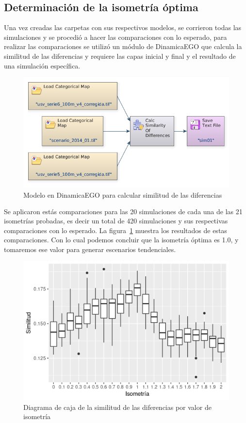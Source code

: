 \documentclass[12pt,a4paper,oldfontcommands]{article}
\begin{document}
\subsection{Determinación de la isometría óptima}
Una vez creadas las carpetas con sus respectivos modelos, se corrieron todas las simulaciones y se procedió a hacer las comparaciones con lo esperado, para realizar las comparaciones se utilizó un módulo de DinamicaEGO que calcula la similitud de las diferencias y requiere las capas inicial y final y el resultado de una simulación específica.
\begin{figure}[h]
	\centering
	\includegraphics[width=1\textwidth]{./figuras/similitud.png}
	\caption{Modelo en DinamicaEGO para calcular similitud de las diferencias}
\end{figure}
\bigskip
Se aplicaron estás comparaciones para las 20 simulaciones de cada una de las 21 isometrías probadas, es decir un total de 420 simulaciones y sus respectivas comparaciones con lo esperado. La figura~\ref{fig:isometria} muestra los resultados de estas comparaciones. Con lo cual podemos concluir que la isometría óptima es 1.0, y tomaremos ese valor para generar escenarios tendenciales.
\begin{figure}[h]
	\centering
	\includegraphics[width=1\textwidth]{./figuras/similitud_isometria.png}
	\caption{Diagrama de caja de la similitud de las diferencias por valor de isometría}
	\label{fig:isometria}
\end{figure}
\bigskip
\end{document}
